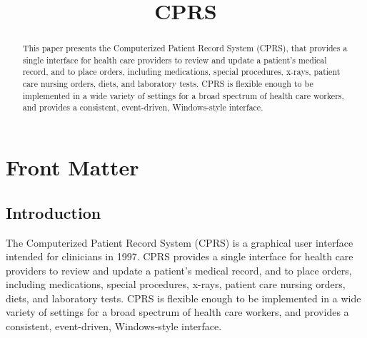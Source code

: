 \documentclass{OSEHRAArticle}
\title{CPRS}
\author{}
\newcommand{\OTJhandlerIDnumber}{2}
\begin{document}
%
%
\OTJhandlefooter{\OTJhandlerIDnumber}


\ifpdf
\else
\fi


\maketitle


\ifhtml
\chapter*{Front Matter\label{front}}
\fi


\begin{abstract}
\noindent
This paper presents the Computerized Patient Record System (CPRS), that
provides a single interface for health care providers to review and update a
patient’s medical record, and to place orders, including medications, special
procedures, x-rays, patient care nursing orders, diets, and laboratory tests.
CPRS is flexible enough to be implemented in a wide variety of settings for a
broad spectrum of health care workers, and provides a consistent, event-driven,
Windows-style interface.
\end{abstract}

\tableofcontents

\section{Introduction}

The Computerized Patient Record System (CPRS) is a graphical user interface
intended for clinicians in 1997. CPRS provides a single interface for health
care providers to review and update a patient’s medical record, and to place
orders, including medications, special procedures, x-rays, patient care nursing
orders, diets, and laboratory tests. CPRS is flexible enough to be implemented
in a wide variety of settings for a broad spectrum of health care workers, and
provides a consistent, event-driven, Windows-style interface.
\end{document}
